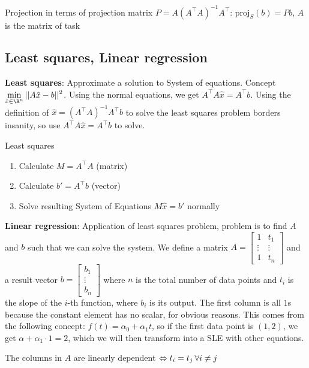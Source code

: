 \shorttheorem Projection in terms of projection matrix $P = A(A^{\top}A)^{-1}A^{\top}$: $\text{proj}_S(b) = Pb$, $A$ is the matrix of task

\newsectionNoPB
\subsection{Least squares, Linear regression}
\textbf{Least squares}: Approximate a solution to System of equations.
Concept $\displaystyle \min_{\hat{x} \in \R^n} ||A\hat{x} - b||^2$.
Using the normal equations, we get $A^{\top}A\hat{x} = A^{\top}b$.
Using the definition of $\hat{x} = (A^{\top}A)^{-1}A^{\top}b$ to solve the least squares problem borders insanity, so use $A^{\top}A\hat{x} = A^{\top}b$ to solve.
\begin{usage}[]{Least squares}
    \begin{enumerate}[label=(\roman*)]
        \item Calculate $M = A^{\top}A$ (matrix)
        \item Calculate $b' = A^{\top}b$ (vector)
        \item Solve resulting System of Equations $M\hat{x} = b'$ normally
    \end{enumerate}
\end{usage}

\textbf{Linear regression}: Application of least squares problem, problem is to find $A$ and $b$ such that we can solve the system.
We define a matrix
$A = \begin{bmatrix}
        1      & t_1    \\
        \vdots & \vdots \\
        1      & t_n
    \end{bmatrix}$
and a result vector
$b = \begin{bmatrix}
        b_1 \\\vdots\\b_n
    \end{bmatrix}$
where $n$ is the total number of data points and $t_i$ is the slope of the $i$-th function, where $b_i$ is its output.
The first column is all $1$s because the constant element has no scalar, for obvious reasons.
This comes from the following concept: $f(t) = \alpha_0 + \alpha_1 t$, so if the first data point is $(1, 2)$, we get $\alpha + \alpha_1 \cdot 1 = 2$, which we will then transform into a SLE with other equations.

\setcounter{all}{2}\shortlemma The columns in $A$ are linearly dependent $\Leftrightarrow t_i = t_j \hspace{0.2em} \forall i \neq j$


